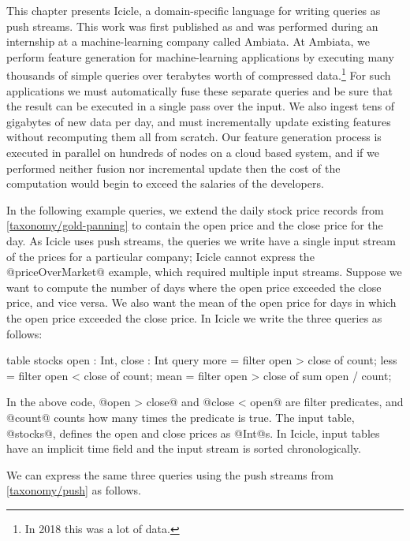 \label{icicle:s:Introduction}

This chapter presents Icicle, a domain-specific language for writing queries as push streams.
This work was first published as \citep{robinson2016icicle} and was performed during an internship at a machine-learning company called Ambiata.
At Ambiata, we perform feature generation for machine-learning applications by executing many thousands of simple queries over terabytes worth of compressed data.\footnote{In 2018 this was a lot of data.}
For such applications we must automatically fuse these separate queries and be sure that the result can be executed in a single pass over the input.
We also ingest tens of gigabytes of new data per day, and must incrementally update existing features without recomputing them all from scratch.
Our feature generation process is executed in parallel on hundreds of nodes on a cloud based system, and if we performed neither fusion nor incremental update then the cost of the computation would begin to exceed the salaries of the developers.

In the following example queries, we extend the daily stock price records from \cref{taxonomy/gold-panning} to contain the open price and the close price for the day.
As Icicle uses push streams, the queries we write have a single input stream of the prices for a particular company; Icicle cannot express the @priceOverMarket@ example, which required multiple input streams.
Suppose we want to compute the number of days where the open price exceeded the close price, and vice versa.
We also want the mean of the open price for days in which the open price exceeded the close price.
In Icicle we write the three queries as follows:

\begin{icicle}
table stocks { open : Int, close : Int }
query 
  more = filter open > close of count;
  less = filter open < close of count;
  mean = filter open > close of sum open / count;
\end{icicle}

In the above code, @open > close@ and @close < open@ are filter predicates, and @count@ counts how many times the predicate is true.
The input table, @stocks@, defines the open and close prices as @Int@s.
In Icicle, input tables have an implicit time field and the input stream is sorted chronologically.

We can express the same three queries using the push streams from \cref{taxonomy/push} as follows.


